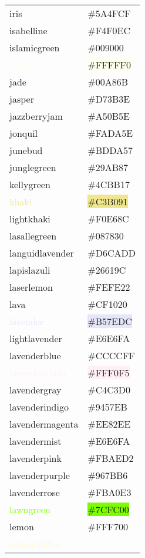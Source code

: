 \documentclass[
]{article}
\begin{document}
\begin{longtable}[]{@{}ll@{}}
\textcolor{iris}{iris} & \colorbox{iris}{\#5A4FCF}\tabularnewline
\textcolor{isabelline}{isabelline} &
\colorbox{isabelline}{\#F4F0EC}\tabularnewline
\textcolor{islamicgreen}{islamicgreen} &
\colorbox{islamicgreen}{\#009000}\tabularnewline
\textcolor{ivory}{ivory} & \colorbox{ivory}{\#FFFFF0}\tabularnewline
\textcolor{jade}{jade} & \colorbox{jade}{\#00A86B}\tabularnewline
\textcolor{jasper}{jasper} & \colorbox{jasper}{\#D73B3E}\tabularnewline
\textcolor{jazzberryjam}{jazzberryjam} &
\colorbox{jazzberryjam}{\#A50B5E}\tabularnewline
\textcolor{jonquil}{jonquil} &
\colorbox{jonquil}{\#FADA5E}\tabularnewline
\textcolor{junebud}{junebud} &
\colorbox{junebud}{\#BDDA57}\tabularnewline
\textcolor{junglegreen}{junglegreen} &
\colorbox{junglegreen}{\#29AB87}\tabularnewline
\textcolor{kellygreen}{kellygreen} &
\colorbox{kellygreen}{\#4CBB17}\tabularnewline
\textcolor{khaki}{khaki} & \colorbox{khaki}{\#C3B091}\tabularnewline
\textcolor{lightkhaki}{lightkhaki} &
\colorbox{lightkhaki}{\#F0E68C}\tabularnewline
\textcolor{lasallegreen}{lasallegreen} &
\colorbox{lasallegreen}{\#087830}\tabularnewline
\textcolor{languidlavender}{languidlavender} &
\colorbox{languidlavender}{\#D6CADD}\tabularnewline
\textcolor{lapislazuli}{lapislazuli} &
\colorbox{lapislazuli}{\#26619C}\tabularnewline
\textcolor{laserlemon}{laserlemon} &
\colorbox{laserlemon}{\#FEFE22}\tabularnewline
\textcolor{lava}{lava} & \colorbox{lava}{\#CF1020}\tabularnewline
\textcolor{lavender}{lavender} &
\colorbox{lavender}{\#B57EDC}\tabularnewline
\textcolor{lightlavender}{lightlavender} &
\colorbox{lightlavender}{\#E6E6FA}\tabularnewline
\textcolor{lavenderblue}{lavenderblue} &
\colorbox{lavenderblue}{\#CCCCFF}\tabularnewline
\textcolor{lavenderblush}{lavenderblush} &
\colorbox{lavenderblush}{\#FFF0F5}\tabularnewline
\textcolor{lavendergray}{lavendergray} &
\colorbox{lavendergray}{\#C4C3D0}\tabularnewline
\textcolor{lavenderindigo}{lavenderindigo} &
\colorbox{lavenderindigo}{\#9457EB}\tabularnewline
\textcolor{lavendermagenta}{lavendermagenta} &
\colorbox{lavendermagenta}{\#EE82EE}\tabularnewline
\textcolor{lavendermist}{lavendermist} &
\colorbox{lightlavender}{\#E6E6FA}\tabularnewline
\textcolor{lavenderpink}{lavenderpink} &
\colorbox{lavenderpink}{\#FBAED2}\tabularnewline
\textcolor{lavenderpurple}{lavenderpurple} &
\colorbox{lavenderpurple}{\#967BB6}\tabularnewline
\textcolor{lavenderrose}{lavenderrose} &
\colorbox{lavenderrose}{\#FBA0E3}\tabularnewline
\textcolor{lawngreen}{lawngreen} &
\colorbox{lawngreen}{\#7CFC00}\tabularnewline
\textcolor{lemon}{lemon} & \colorbox{lemon}{\#FFF700}\tabularnewline
\textcolor{lemonchiffon}{lemonchiffon} &

\end{longtable}
\end{document}
